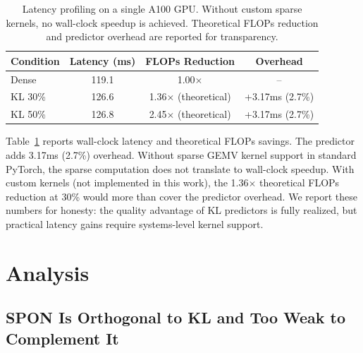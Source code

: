 \documentclass[11pt,a4paper]{article}
\begin{document}
\begin{table}[t]
\centering
\caption{Latency profiling on a single A100 GPU. Without custom sparse kernels, no wall-clock speedup is achieved. Theoretical FLOPs reduction and predictor overhead are reported for transparency.}
\label{tab:latency}
\small
\begin{tabular}{lccc}
\toprule
\textbf{Condition} & \textbf{Latency (ms)} & \textbf{FLOPs Reduction} & \textbf{Overhead} \\
\midrule
Dense & 119.1 & 1.00$\times$ & -- \\
KL 30\% & 126.6 & 1.36$\times$ (theoretical) & +3.17ms (2.7\%) \\
KL 50\% & 126.8 & 2.45$\times$ (theoretical) & +3.17ms (2.7\%) \\
\bottomrule
\end{tabular}
\end{table}

Table~\ref{tab:latency} reports wall-clock latency and theoretical FLOPs savings. The predictor adds 3.17ms (2.7\%) overhead. Without sparse GEMV kernel support in standard PyTorch, the sparse computation does not translate to wall-clock speedup. With custom kernels (not implemented in this work), the 1.36$\times$ theoretical FLOPs reduction at 30\% would more than cover the predictor overhead. We report these numbers for honesty: the quality advantage of KL predictors is fully realized, but practical latency gains require systems-level kernel support.

\section{Analysis}

\subsection{SPON Is Orthogonal to KL and Too Weak to Complement It}
\end{document}
